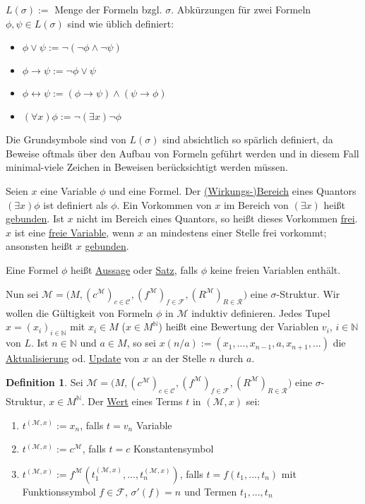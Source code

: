 \documentclass{article}
\theoremstyle{definition}
\newtheorem{dfn}{Definition}
\newcommand{\calC}{\mathcal{C}}
\newcommand{\calF}{\mathcal{F}}
\newcommand{\calM}{\mathcal{M}}
\newcommand{\calR}{\mathcal{R}}
\newcommand{\struc}[3]{\big(#1, (c^{#2})_{c \in \calC_{#3}}, (f^{#2})_{f \in \calF_{#3}}, (R^{#2})_{R \in \calR_{#3}}\big)}
\begin{document}
    $ L(\sigma) := $ Menge der Formeln bzgl. $ \sigma $.
    Abkürzungen für zwei Formeln $ \phi , \psi \in L(\sigma) $ sind wie üblich definiert:
    \begin{itemize}
        \item $ \phi \lor \psi := \neg (\neg \phi \land \neg \psi) $
        \item $ \phi \rightarrow \psi := \neg \phi \lor \psi $
        \item $ \phi \leftrightarrow \psi := (\phi \rightarrow \psi) \land (\psi \rightarrow \phi) $
        \item $ (\forall x) \phi := \neg (\exists x) \neg \phi $
    \end{itemize}

    Die Grundsymbole sind von $ L(\sigma) $ sind absichtlich so spärlich definiert, da Beweise oftmals über den Aufbau von Formeln geführt werden und in diesem Fall minimal-viele Zeichen in Beweisen berücksichtigt werden müssen.

    Seien $ x $ eine Variable $ \phi $ und eine Formel. Der \underline{(Wirkungs-)Bereich} eines Quantors $ (\exists x) \phi $ ist definiert als $ \phi $.
    Ein Vorkommen von $ x $ im Bereich von $ (\exists x) $ heißt \underline{gebunden}.
    Ist $ x $ nicht im Bereich eines Quantors, so heißt dieses Vorkommen \underline{frei}.
    $ x $ ist eine \underline{freie Variable}, wenn $ x $ an mindestens einer Stelle frei vorkommt; ansonsten heißt $ x $ \underline{gebunden}.

    Eine Formel $ \phi $ heißt \underline{Aussage} oder \underline{Satz}, falls $ \phi $ keine freien Variablen enthält.

    Nun sei $ \calM = \struc{M}{\calM}{} $ eine $ \sigma $-Struktur.
    Wir wollen die Gültigkeit von Formeln $ \phi $ in $ \calM $ induktiv definieren.
    Jedes Tupel $ x = (x_i)_{i \in \mathbb{N}} $ mit $ x_i \in M $ ($ x \in M^{\mathbb{N}} $) heißt eine Bewertung der Variablen $ v_i $, $ i \in \mathbb{N} $ von $ L $.
    Ist $ n \in \mathbb{N} $ und $ a \in M $, so sei $ x(n/a) := (x_1, ..., x_{n-1}, a, x_{n+1}, ...) $ die \underline{Aktualisierung} od. \underline{Update} von $ x $ an der Stelle $ n $ durch $ a $.

    \begin{dfn}
        Sei $ \calM = \struc{M}{\calM}{} $ eine $ \sigma $-Struktur, $ x \in M^{\mathbb{N}} $.
        Der \underline{Wert} eines Terms $ t $ in $ (\calM, x) $ sei:
        \begin{enumerate}
            \item $ t^{(\calM, x)} := x_n $, falls $ t = v_n $ Variable
            \item $ t^{(\calM, x)} := c^\calM $, falls $ t = c $ Konstantensymbol
            \item $ t^{(\calM, x)} := f^\calM(t_1^{(\calM, x)}, ..., t_n^{(\calM, x)}) $, falls $ t = f(t_1, ..., t_n) $ mit Funktionssymbol $ f \in \calF $, $ \sigma'(f) = n $ und Termen $ t_1, ..., t_n $
        \end{enumerate}
    \end{dfn}
\end{document}
